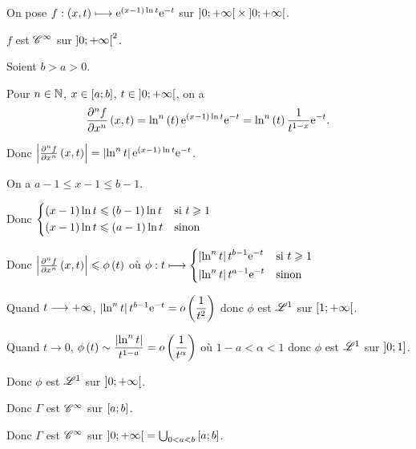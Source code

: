 \begin{dem}
On pose \(f:\left(x,t\right)\longmapsto\mathrm{e}^{\left(x-1\right)\ln t}\mathrm{e}^{-t}\) sur \(\left]0;+\infty\right[\times\left]0;+\infty\right[\).

\(f\) est \(\mathscr{C}^{\infty}\) sur \(\left]0;+\infty\right[^2\).

Soient \(b>a>0\).

Pour \(n\in\mathbb{N}\), \(x\in\left[a;b\right]\), \(t\in\left]0;+\infty\right[\), on a \[\pdv[order=n]{f}{x}\left(x,t\right)=\ln^n\left(t\right)\mathrm{e}^{\left(x-1\right)\ln t}\mathrm{e}^{-t}=\ln^n\left(t\right)\dfrac{1}{t^{1-x}}\mathrm{e}^{-t}.\]

Donc \(\left\lvert\pdv[order=n]{f}{x}\left(x,t\right)\right\rvert=\left\lvert\ln^nt\right\rvert\mathrm{e}^{\left(x-1\right)\ln t}\mathrm{e}^{-t}\).

On a \(a-1\leq x-1\leq b-1\).

Donc \(\begin{dcases}
\left(x-1\right)\ln t\leqslant\left(b-1\right)\ln t &\text{si }t\geqslant1 \\
\left(x-1\right)\ln t\leqslant\left(a-1\right)\ln t &\text{sinon}
\end{dcases}\)

Donc \(\left\lvert\pdv[order=n]{f}{x}\left(x,t\right)\right\rvert\leqslant\phi\left(t\right)\) où \(\phi:t\longmapsto\begin{dcases}
    \left\lvert\ln^nt\right\rvert t^{b-1}\mathrm{e}^{-t} &\text{si }t\geqslant1 \\
    \left\lvert\ln^nt\right\rvert t^{a-1}\mathrm{e}^{-t} &\text{sinon}
\end{dcases}\)

Quand \(t\longrightarrow+\infty\), \(\left\lvert\ln^nt\right\rvert t^{b-1}\mathrm{e}^{-t}=o\left(\dfrac{1}{t^2}\right)\) donc \(\phi\) est \(\integ{1}{}{}\) sur \(\left[1;+\infty\right[\).

Quand \(t\to0\), \(\phi\left(t\right)\sim\dfrac{\left\lvert\ln^nt\right\rvert}{t^{1-a}}=o\left(\dfrac{1}{t^\alpha}\right)\) où \(1-a<\alpha<1\) donc \(\phi\) est \(\integ{1}{}{}\) sur \(\left]0;1\right]\).

Donc \(\phi\) est \(\integ{1}{}{}\) sur \(\left]0;+\infty\right[\).

Donc \(\Gamma\) est \(\mathscr{C}^{\infty}\) sur \(\left[a;b\right]\).

Donc \(\Gamma\) est \(\mathscr{C}^{\infty}\) sur \(\left]0;+\infty\right[=\bigcup_{0<a<b}\left[a;b\right]\).
\end{dem}
